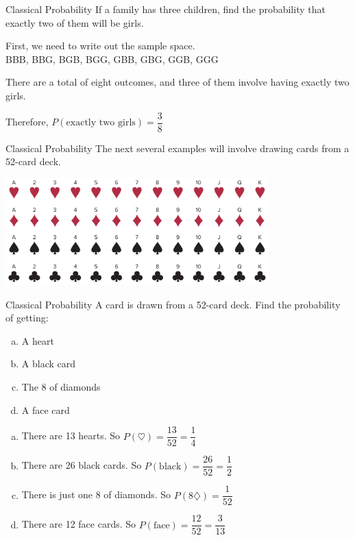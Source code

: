 \documentclass[t, aspectratio=169]{beamer}
\newcommand{\?}{\stackrel{?}{=}}
\begin{document}
	\begin{frame}{Classical Probability}
		If a family has three children, find the probability that exactly two of them will be girls. \pause
		
		First, we need to write out the sample space. \\
		BBB, BBG, BGB, BGG, GBB, GBG, GGB, GGG \pause
		
		There are a total of eight outcomes, and three of them involve having exactly two girls. \pause
		
		Therefore, $P(\text{exactly two girls}) = \dfrac38$
	\end{frame}

	\begin{frame}{Classical Probability}
		The next several examples will involve drawing cards from a 52-card deck. \pause
		
		\includegraphics[width=4in]{deck-cards.png}
	\end{frame}

	\begin{frame}{Classical Probability}
		A card is drawn from a 52-card deck. Find the probability of getting: \begin{enumerate}[a)]
			\item A heart
			\item A black card
			\item The 8 of diamonds
			\item A face card
		\end{enumerate} \pause
		\begin{enumerate}[a)]
			\item There are 13 hearts. So $P(\heartsuit) = \dfrac{13}{52} = \dfrac14$ \pause
			\item There are 26 black cards. So $P(\text{black}) = \dfrac{26}{52} = \dfrac12$ \pause
			\item There is just one 8 of diamonds. So $P(8\diamondsuit) = \dfrac{1}{52}$ \pause
			\item There are 12 face cards. So $P(\text{face}) = \dfrac{12}{52} = \dfrac{3}{13}$
		\end{enumerate}
	\end{frame}
\end{document}
